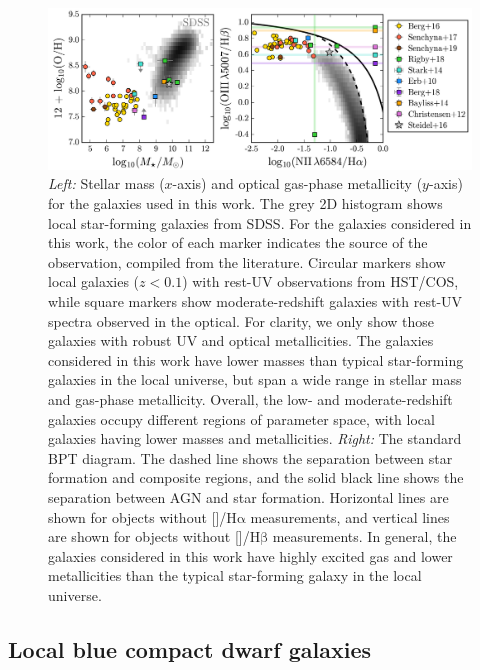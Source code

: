 \documentclass[preprint2]{aastex62}
\newcommand{\nii}{[\ion{N}{2}]}
\newcommand{\oiii}{[\ion{O}{3}]}
\newcommand{\ha}{\ensuremath{\mathrm{H\alpha}}\xspace}
\newcommand{\hb}{\ensuremath{\mathrm{H\beta}}\xspace}
\begin{document}
\begin{figure}
  \begin{center}
    \includegraphics[width=\linewidth]{figs/f1.png}
    \caption{\emph{Left:} Stellar mass ($x$-axis) and optical gas-phase metallicity ($y$-axis) for the galaxies used in this work. The grey 2D histogram shows local star-forming galaxies from SDSS. For the galaxies considered in this work, the color of each marker indicates the source of the observation, compiled from the literature. Circular markers show local galaxies ($z<0.1$) with rest-UV observations from HST/COS, while square markers show moderate-redshift galaxies with rest-UV spectra observed in the optical. For clarity, we only show those galaxies with robust UV and optical metallicities. The galaxies considered in this work have lower masses than typical star-forming galaxies in the local universe, but span a wide range in stellar mass and gas-phase metallicity. Overall, the low- and moderate-redshift galaxies occupy different regions of parameter space, with local galaxies having lower masses and metallicities. \emph{Right:} The standard BPT diagram. The dashed line shows the \citet{Kauffmann+2003b} separation between star formation and composite regions, and the solid black line shows the \citet{Kewley+2001} separation between AGN and star formation. Horizontal lines are shown for objects without \nii{}/\ha{} measurements, and vertical lines are shown for objects without \oiii{}/\hb{} measurements. In general, the galaxies considered in this work have highly excited gas and lower metallicities than the typical star-forming galaxy in the local universe.}
    \label{fig:sampleMZ}
  \end{center}
\end{figure}

\subsection{Local blue compact dwarf galaxies}\label{sec:data:BCDs}
\end{document}
